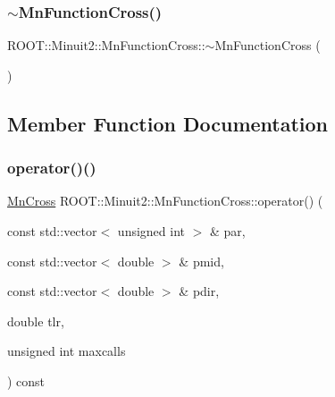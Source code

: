 \mbox{\label{classROOT_1_1Minuit2_1_1MnFunctionCross_a6eddadf7793152d1c7a4604b2f374035}} 
\subsubsection{\texorpdfstring{$\sim$MnFunctionCross()}{~MnFunctionCross()}\hspace{0.1cm}{\footnotesize\ttfamily [3/3]}}
{\footnotesize\ttfamily R\+O\+O\+T\+::\+Minuit2\+::\+Mn\+Function\+Cross\+::$\sim$\+Mn\+Function\+Cross (\begin{DoxyParamCaption}{ }\end{DoxyParamCaption})\hspace{0.3cm}{\ttfamily [inline]}}



\subsection{Member Function Documentation}
\mbox{\label{classROOT_1_1Minuit2_1_1MnFunctionCross_ace9b7e1472f82cb23525365e5f061477}} 
\subsubsection{\texorpdfstring{operator()()}{operator()()}\hspace{0.1cm}{\footnotesize\ttfamily [1/3]}}
{\footnotesize\ttfamily \mbox{\hyperlink{classROOT_1_1Minuit2_1_1MnCross}{Mn\+Cross}} R\+O\+O\+T\+::\+Minuit2\+::\+Mn\+Function\+Cross\+::operator() (\begin{DoxyParamCaption}\item[{const std\+::vector$<$ unsigned int $>$ \&}]{par,  }\item[{const std\+::vector$<$ double $>$ \&}]{pmid,  }\item[{const std\+::vector$<$ double $>$ \&}]{pdir,  }\item[{double}]{tlr,  }\item[{unsigned int}]{maxcalls }\end{DoxyParamCaption}) const}


